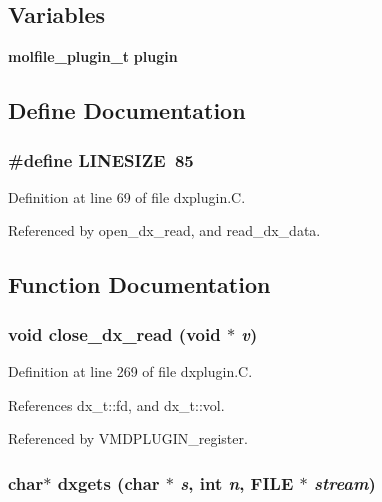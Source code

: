 \subsection*{Variables}
\begin{CompactItemize}
\item 
{\bf molfile\_\-plugin\_\-t} {\bf plugin}
\end{CompactItemize}


\subsection{Define Documentation}
\subsubsection{\setlength{\rightskip}{0pt plus 5cm}\#define LINESIZE\ 85}\label{dxplugin_8C_a0}




Definition at line 69 of file dxplugin.C.

Referenced by open\_\-dx\_\-read, and read\_\-dx\_\-data.

\subsection{Function Documentation}
\subsubsection{\setlength{\rightskip}{0pt plus 5cm}void close\_\-dx\_\-read (void $\ast$ {\em v})\hspace{0.3cm}{\tt  [static]}}\label{dxplugin_8C_a6}




Definition at line 269 of file dxplugin.C.

References dx\_\-t::fd, and dx\_\-t::vol.

Referenced by VMDPLUGIN\_\-register.
\subsubsection{\setlength{\rightskip}{0pt plus 5cm}char$\ast$ dxgets (char $\ast$ {\em s}, int {\em n}, FILE $\ast$ {\em stream})\hspace{0.3cm}{\tt  [static]}}\label{dxplugin_8C_a2}




